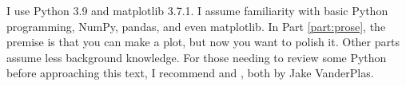 I use Python 3.9 and matplotlib 3.7.1. I assume familiarity with basic Python programming, NumPy, pandas, and even matplotlib. In Part \ref{part:prose}, the premise is that you can make a plot, but now you want to polish it. Other parts assume less background knowledge. For those needing to review some Python before approaching this text, I recommend  and , both by Jake VanderPlas.

